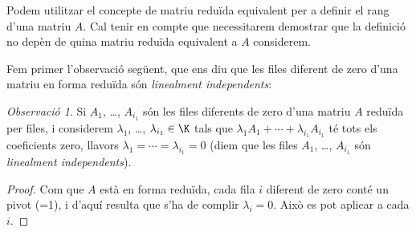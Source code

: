 \documentclass[a4paper,12pt,twoside]{article}
\newcommand{\1}{\mathbf{1}}
\newcommand{\0}{\mathbf{0}}
\theoremstyle{definition}
\theoremstyle{remark}
\newtheorem{observacio}[teorema]{Observació}
\begin{document}
Podem utilitzar el concepte de matriu reduïda equivalent per a definir el rang d'una matriu $A$. Cal tenir en compte que necessitarem demostrar que la definició no depèn de quina matriu reduïda equivalent a $A$ considerem.

Fem primer l'observació següent, que ens diu que les files diferent de zero d'una matriu en forma reduïda són \emph{linealment independents}:
\begin{observacio}\label{obs:linindep}
Si $A_1$, \dots , $A_{i_1}$ són les files diferents de zero d'una matriu $A$ reduïda per files, i considerem $\lambda_1$, \dots , $\lambda_{i_1} \in \K$ tals que $\lambda_1A_1+\cdots+\lambda_{i_1}A_{i_1}$ té tots els coeficients zero, llavors $\lambda_1 = \cdots = \lambda_{i_1}=0$ (diem que les files $A_1$, \ldots, $A_{i_1}$ són \emph{linealment independents}). 
\end{observacio}
\begin{proof}
Com que $A$ està en forma reduïda, cada fila $i$ diferent de zero conté un pivot (=1), i d'aquí resulta que s'ha de complir $\lambda_i=0$. Això es pot aplicar a cada $i$.
\end{proof}
\end{document}
